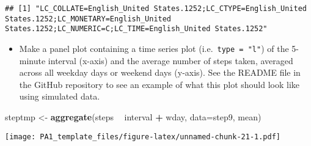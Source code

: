 \documentclass[
]{article}
\newenvironment{Shaded}{\begin{snugshade}}{\end{snugshade}}
\newcommand{\DataTypeTok}[1]{\textcolor[rgb]{0.13,0.29,0.53}{#1}}
\newcommand{\KeywordTok}[1]{\textcolor[rgb]{0.13,0.29,0.53}{\textbf{#1}}}
\newcommand{\NormalTok}[1]{#1}
\newcommand{\OperatorTok}[1]{\textcolor[rgb]{0.81,0.36,0.00}{\textbf{#1}}}
\newcommand{\StringTok}[1]{\textcolor[rgb]{0.31,0.60,0.02}{#1}}
\providecommand{\tightlist}{%
  \setlength{\itemsep}{0pt}\setlength{\parskip}{0pt}}
\begin{document}
\begin{verbatim}
## [1] "LC_COLLATE=English_United States.1252;LC_CTYPE=English_United States.1252;LC_MONETARY=English_United States.1252;LC_NUMERIC=C;LC_TIME=English_United States.1252"
\end{verbatim}

\begin{Shaded}
\end{Shaded}

\begin{itemize}
\tightlist
\item
  Make a panel plot containing a time series plot
  (i.e.~\color{red}{\verb|type = "l"|}\texttt{type\ =\ "l"}) of the
  5-minute interval (x-axis) and the average number of steps taken,
  averaged across all weekday days or weekend days (y-axis). See the
  README file in the GitHub repository to see an example of what this
  plot should look like using simulated data.
\end{itemize}

\begin{Shaded}
\begin{Highlighting}[]
\NormalTok{steptmp <-}\StringTok{ }\KeywordTok{aggregate}\NormalTok{(steps }\OperatorTok{~}\StringTok{ }\NormalTok{interval }\OperatorTok{+}\StringTok{ }\NormalTok{wday, }\DataTypeTok{data=}\NormalTok{step9, mean)}
\end{Highlighting}
\end{Shaded}

\texttt{[image: PA1\_template\_files/figure-latex/unnamed-chunk-21-1.pdf]}
\end{document}
